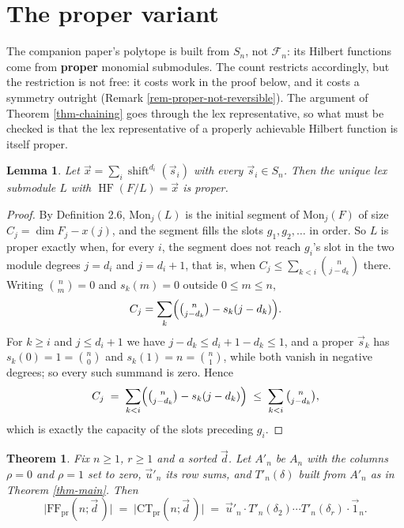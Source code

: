 \documentclass[11pt, a4paper, abstract=yes]{scrartcl}
\theoremstyle{definition}
\theoremstyle{remark}
\theoremstyle{plain}
\newtheorem{lemma}[definition]{Lemma}
\newtheorem{theorem}[definition]{Theorem}
\newcommand{\shift}{\operatorname{shift}}
\newcommand{\HF}{\operatorname{HF}}
\begin{document}
\section{The proper variant}
\label{sec-proper}
The companion paper's polytope is built from \(S_n\), not \(\mathcal F_n\): its Hilbert functions come
from \textbf{proper} monomial submodules. The count restricts accordingly, but the restriction is not free:
it costs work in the proof below, and it costs a symmetry outright (Remark
\ref{rem-proper-not-reversible}).
The argument of Theorem \ref{thm-chaining} goes through the lex representative, so what must be checked
is that the lex representative of a properly achievable Hilbert function is itself proper.

\begin{lemma}
Let \(\vec x=\sum_i\shift^{d_i}(\vec s_i)\) with every \(\vec s_i\in S_n\). Then the unique lex submodule
\(L\) with \(\HF(F/L)=\vec x\) is proper.
\label{lem-lexproper}
\end{lemma}

\begin{proof}
By Definition 2.6, \(\mathrm{Mon}_j(L)\) is the initial segment of \(\mathrm{Mon}_j(F)\) of size
\(C_j=\dim F_j-x(j)\), and the segment fills the slots \(g_1,g_2,\dots\) in order. So \(L\) is proper
exactly when, for every \(i\), the segment does not reach \(g_i\)'s slot in the two module degrees
\(j=d_i\) and \(j=d_i+1\), that is, when \(C_j\le\sum_{k<i}\binom n{j-d_k}\) there. Writing
\(\binom nm=0\) and \(s_k(m)=0\) outside \(0\le m\le n\),
\[
  C_j=\sum_k\Bigl(\tbinom n{j-d_k}-s_k(j-d_k)\Bigr).
\]
For \(k\ge i\) and \(j\le d_i+1\) we have \(j-d_k\le d_i+1-d_k\le1\), and a proper \(\vec s_k\) has
\(s_k(0)=1=\binom n0\) and \(s_k(1)=n=\binom n1\), while both vanish in negative degrees; so every
such summand is zero. Hence
\[
  C_j\;=\;\sum_{k<i}\Bigl(\tbinom n{j-d_k}-s_k(j-d_k)\Bigr)\;\le\;\sum_{k<i}\tbinom n{j-d_k} ,
\]
which is exactly the capacity of the slots preceding \(g_i\).
\end{proof}

\begin{theorem}
Fix \(n\ge1\), \(r\ge1\) and a sorted \(\vec d\). Let \(A'_n\) be \(A_n\) with the columns \(\rho=0\) and
\(\rho=1\) set to zero, \(\vec u'_n\) its row sums, and \(T'_n(\delta)\) built from \(A'_n\) as in
Theorem \ref{thm-main}. Then
\begin{equation}\label{eq:auto-16}
  \lvert\mathrm{FF}_{\mathrm{pr}}(n;\vec d\,)\rvert
  \;=\;\lvert\mathrm{CT}_{\mathrm{pr}}(n;\vec d\,)\rvert
  \;=\;\vec u'_n\cdot T'_n(\delta_2)\cdots T'_n(\delta_r)\cdot\vec 1_n .
\end{equation}
\label{thm-proper}
\end{theorem}
\end{document}
